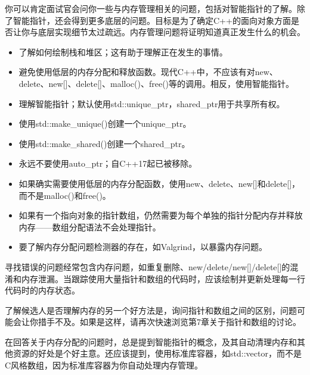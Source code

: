 
你可以肯定面试官会问你一些与内存管理相关的问题，包括对智能指针的了解。除了智能指针，还会得到更多底层的问题。目标是为了确定C++的面向对象方面是否让你与底层实现细节太过疏远。内存管理问题将证明知道真正发生什么的机会。


\begin{itemize}
\item
了解如何绘制栈和堆区；这有助于理解正在发生的事情。

\item
避免使用低层的内存分配和释放函数。现代C++中，不应该有对new、delete、new[]、delete[]、malloc()、free()等的调用。相反，使用智能指针。

\item
理解智能指针；默认使用std::unique\_ptr，shared\_ptr用于共享所有权。

\item
使用std::make\_unique()创建一个unique\_ptr。

\item
使用std::make\_shared()创建一个shared\_ptr。

\item
永远不要使用auto\_ptr；自C++17起已被移除。

\item
如果确实需要使用低层的内存分配函数，使用new、delete、new[]和delete[]，而不是malloc()和free()。

\item
如果有一个指向对象的指针数组，仍然需要为每个单独的指针分配内存并释放内存——数组分配语法不会处理指针。

\item
要了解内存分配问题检测器的存在，如Valgrind，以暴露内存问题。
\end{itemize}


寻找错误的问题经常包含内存问题，如重复删除、new/delete/new[]/delete[]的混淆和内存泄漏。当跟踪使用大量指针和数组的代码时，应该绘制并更新处理每一行代码时的内存状态。

了解候选人是否理解内存的另一个好方法是，询问指针和数组之间的区别，问题可能会让你措手不及。如果是这样，请再次快速浏览第7章关于指针和数组的讨论。

在回答关于内存分配的问题时，总是提到智能指针的概念，及其自动清理内存和其他资源的好处是个好主意。还应该提到，使用标准库容器，如std::vector，而不是C风格数组，因为标准库容器为你自动处理内存管理。







